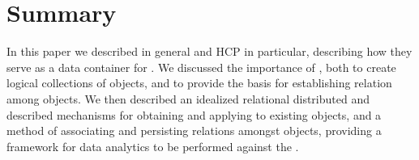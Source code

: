 
\section{Summary} \label{s:conclusion}
In this paper we described \oss{} in general and HCP in particular, describing how they serve as a data container for \ud{}. We discussed the importance of \md{}, both to create logical collections of objects, and to provide the basis for establishing relation among objects. We then described an idealized relational distributed \os{} and described mechanisms for obtaining and applying \md{} to existing objects, and a method of associating and persisting relations amongst objects, providing a framework for data analytics to be performed against the \os{}.

